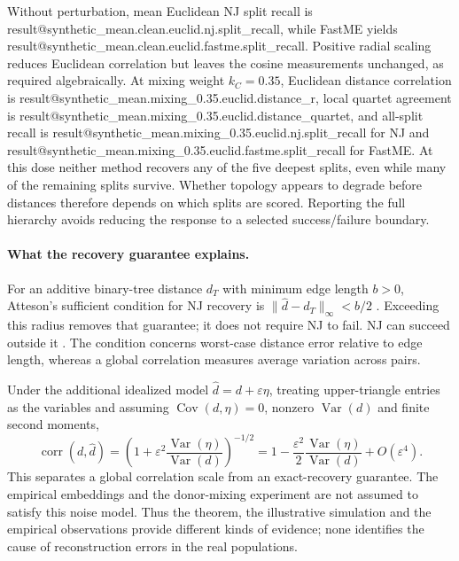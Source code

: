 \documentclass[mlmain]{jmlr}
\makeatletter
\newcommand{\Result}[1]{\csname result@#1\endcsname}
\makeatother
\begin{document}
Without perturbation, mean Euclidean NJ split recall is
\Result{synthetic_mean.clean.euclid.nj.split_recall}, while FastME yields
\Result{synthetic_mean.clean.euclid.fastme.split_recall}.
Positive radial scaling reduces Euclidean correlation but leaves the cosine measurements
unchanged, as required algebraically. At mixing weight $k_C=0.35$, Euclidean distance correlation
is \Result{synthetic_mean.mixing_0.35.euclid.distance_r}, local quartet agreement is
\Result{synthetic_mean.mixing_0.35.euclid.distance_quartet}, and all-split recall is
\Result{synthetic_mean.mixing_0.35.euclid.nj.split_recall} for NJ and
\Result{synthetic_mean.mixing_0.35.euclid.fastme.split_recall} for FastME.
At this dose neither method recovers any of the five deepest splits, even while many of the
remaining splits survive. Whether topology appears to degrade before distances therefore depends
on which splits are scored. Reporting the full hierarchy avoids reducing the response to a selected
success/failure boundary.

\paragraph{What the recovery guarantee explains.}
For an additive binary-tree distance $d_T$ with minimum edge length $b>0$, Atteson's sufficient
condition for NJ recovery is $\|\hat d-d_T\|_\infty<b/2$ \citep{atteson1999performance}.
Exceeding this radius removes that guarantee; it does not require NJ to fail. NJ can succeed
outside it \citep{mihaescu2009neighbor}. The condition concerns worst-case distance error relative
to edge length, whereas a global correlation measures average variation across pairs.

Under the additional idealized model $\hat d=d+\varepsilon\eta$, treating upper-triangle entries
as the variables and assuming $\operatorname{Cov}(d,\eta)=0$, nonzero $\operatorname{Var}(d)$ and
finite second moments,
\[
 \operatorname{corr}(d,\hat d)=
 \left(1+\varepsilon^2\frac{\operatorname{Var}(\eta)}{\operatorname{Var}(d)}\right)^{-1/2}
 =1-\frac{\varepsilon^2}{2}\frac{\operatorname{Var}(\eta)}{\operatorname{Var}(d)}+O(\varepsilon^4).
\]
This separates a global correlation scale from an exact-recovery guarantee. The empirical
embeddings and the donor-mixing experiment are not assumed to satisfy this noise model. Thus the
theorem, the illustrative simulation and the empirical observations provide different kinds of
evidence; none identifies the cause of reconstruction errors in the real populations.
\end{document}
